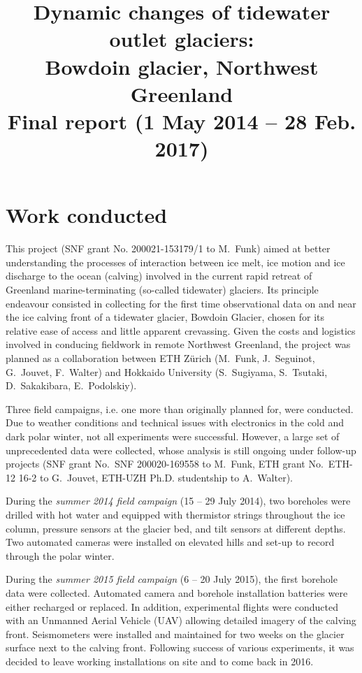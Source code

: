 \documentclass{article}
\title{\vspace{-2ex}
       Dynamic changes of tidewater outlet glaciers:\\
       Bowdoin glacier, Northwest Greenland\\\bigskip
       \large Final report (1 May 2014 -- 28 Feb. 2017)}
\author{}
\date{}
\begin{document}

\maketitle

\section{Work conducted}

This project (SNF grant No. 200021-153179/1 to M.~Funk) aimed at better
understanding the processes of interaction between ice melt, ice motion and ice
discharge to the ocean (calving) involved in the current rapid retreat of
Greenland marine-terminating (so-called tidewater) glaciers. Its principle
endeavour consisted in collecting for the first time observational data on and
near the ice calving front of a tidewater glacier, Bowdoin Glacier, chosen for
its relative ease of access and little apparent crevassing. Given the costs and
logistics involved in conducing fieldwork in remote Northwest Greenland, the
project was planned as a collaboration between ETH Zürich (M.~Funk,
J.~Seguinot, G.~Jouvet, F.~Walter) and Hokkaido University (S.~Sugiyama,
S.~Tsutaki, D.~Sakakibara, E.~Podolskiy).

Three field campaigns, i.e. one more than originally planned for, were
conducted. Due to weather conditions and technical issues with electronics in
the cold and dark polar winter, not all experiments were successful. However, a
large set of unprecedented data were collected, whose analysis is still ongoing
under follow-up projects (SNF grant No.~SNF 200020-169558 to M.~Funk, ETH grant
No.~ETH-12 16-2 to G.~Jouvet, ETH-UZH Ph.D. studentship to A.~Walter).

During the \emph{summer 2014 field campaign} (15 -- 29 July 2014), two
boreholes were drilled with hot water and equipped with thermistor strings
throughout the ice column, pressure sensors at the glacier bed, and
tilt sensors at different depths. Two automated cameras were installed on
elevated hills and set-up to record through the polar winter.

During the \emph{summer 2015 field campaign} (6 -- 20 July 2015), the first
borehole data were collected. Automated camera and borehole installation
batteries were either recharged or replaced. In addition, experimental flights
were conducted with an Unmanned Aerial Vehicle (UAV) allowing detailed imagery
of the calving front. Seismometers were installed and maintained for two weeks
on the glacier surface next to the calving front. Following success of various
experiments, it was decided to leave working installations on site and to come
back in 2016.
\end{document}
